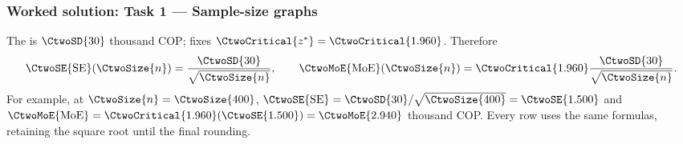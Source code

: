 \subsubsection*{Worked solution: Task 1 --- Sample-size graphs}\label{sol:c3-1-a}
The  is $\CtwoSD{30}$ thousand COP;  fixes $\CtwoCritical{z^*}=\CtwoCritical{1.960}$. Therefore
\[
\CtwoSE{\mathrm{SE}}(\CtwoSize{n})=\frac{\CtwoSD{30}}{\sqrt{\CtwoSize{n}}},\qquad
\CtwoMoE{\mathrm{MoE}}(\CtwoSize{n})=\CtwoCritical{1.960}\frac{\CtwoSD{30}}{\sqrt{\CtwoSize{n}}}.
\]
For example, at $\CtwoSize{n}=\CtwoSize{400}$, $\CtwoSE{\mathrm{SE}}=\CtwoSD{30}/\sqrt{\CtwoSize{400}}=\CtwoSE{1.500}$ and $\CtwoMoE{\mathrm{MoE}}=\CtwoCritical{1.960}(\CtwoSE{1.500})=\CtwoMoE{2.940}$ thousand COP. Every row uses the same formulas, retaining the square root until the final rounding.
